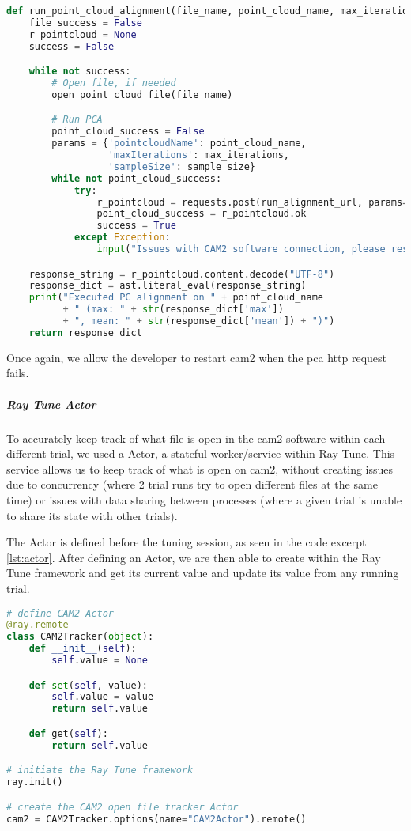 \begin{lstlisting}[language=Python, caption=Running \acrshort{pca} function in \acrshort{cam2}, captionpos=b, label={lst:cam2_file}]
def run_point_cloud_alignment(file_name, point_cloud_name, max_iterations, sample_size):
    file_success = False
    r_pointcloud = None
    success = False

    while not success:
        # Open file, if needed
        open_point_cloud_file(file_name)

        # Run PCA
        point_cloud_success = False
        params = {'pointcloudName': point_cloud_name,
                  'maxIterations': max_iterations,
                  'sampleSize': sample_size}
        while not point_cloud_success:
            try:
                r_pointcloud = requests.post(run_alignment_url, params=params)
                point_cloud_success = r_pointcloud.ok
                success = True
            except Exception:
                input("Issues with CAM2 software connection, please restart the CAM2 software.")

    response_string = r_pointcloud.content.decode("UTF-8")
    response_dict = ast.literal_eval(response_string)
    print("Executed PC alignment on " + point_cloud_name
          + " (max: " + str(response_dict['max'])
          + ", mean: " + str(response_dict['mean']) + ")")
    return response_dict
\end{lstlisting}

Once again, we allow the developer to restart \acrshort{cam2} when the \acrshort{pca} \acrshort{http} request fails.

\subparagraph{Ray Tune Actor}

To accurately keep track of what file is open in the \acrshort{cam2} software within each different trial, we used a Actor, a stateful worker/service within Ray Tune. This service allows us to keep track of what is open on \acrshort{cam2}, without creating issues due to concurrency (where 2 trial runs try to open different files at the same time) or issues with data sharing between processes (where a given trial is unable to share its state with other trials). 

The Actor is defined before the tuning session, as seen in the code excerpt \ref{lst:actor}. After defining an Actor, we are then able to create within the Ray Tune framework and get its current value and update its value from any running trial.

\begin{lstlisting}[language=Python, caption=Initiating a Ray Tune Actor, captionpos=b, label={lst:actor}]
# define CAM2 Actor
@ray.remote
class CAM2Tracker(object):
    def __init__(self):
        self.value = None

    def set(self, value):
        self.value = value
        return self.value

    def get(self):
        return self.value

# initiate the Ray Tune framework
ray.init()

# create the CAM2 open file tracker Actor
cam2 = CAM2Tracker.options(name="CAM2Actor").remote()
\end{lstlisting}

